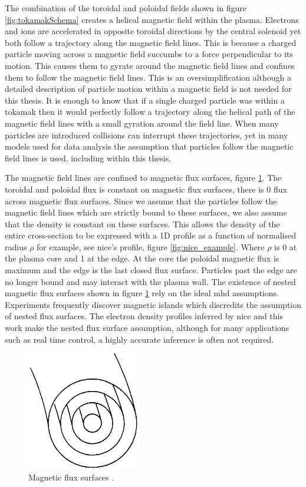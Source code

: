 The combination of the toroidal and poloidal fields shown in figure \ref{fig:tokamakSchema} creates a helical magnetic field within the plasma. Electrons and ions are accelerated in opposite toroidal directions by the central solenoid yet both follow a trajectory along the magnetic field lines. This is because a charged particle moving across a magnetic field succumbs to a force perpendicular to its motion. This causes them to gyrate around the magnetic field lines and confines them to follow the magnetic field lines. This is an oversimplification although a detailed description of particle motion within a magnetic field is not needed for this thesis. It is enough to know that if a single charged particle was within a tokamak then it would perfectly follow a trajectory along the helical path of the magnetic field lines with a small gyration around the field line. When many particles are introduced collisions can interrupt these trajectories, yet in many models used for data analysis the assumption that particles follow the magnetic field lines is used, including within this thesis. 

The magnetic field lines are confined to magnetic flux surfaces, figure \ref{fig:magfluxsurf}. The toroidal and poloidal flux is constant on magnetic flux surfaces, there is 0 flux across magnetic flux surfaces. Since we assume that the particles follow the magnetic field lines which are strictly bound to these surfaces, we also assume that the density is constant on these surfaces. This allows the density of the entire cross-section to be expressed with a 1D profile as a function of normalised radius $\rho$ for example, see \gls{nice}'s profile, figure \ref{fig:nice_example}. Where $\rho$ is 0 at the plasma core and 1 at the edge. At the core the poloidal magnetic flux is maximum and the edge is the last closed flux surface. Particles past the edge are no longer bound and may interact with the plasma wall. The existence of nested magnetic flux surfaces shown in figure \ref{fig:magfluxsurf} rely on the ideal \gls{mhd} assumptions. Experiments frequently discover magnetic islands which discredits the assumption of nested flux surfaces. The electron density profiles inferred by \gls{nice} and this work make the nested flux surface assumption, although for many applications such as real time control, a highly accurate inference is often not required.

\begin{figure}
  \centering
  \includegraphics[width=5cm]{images/fluxsurf.png}
  \caption{Magnetic flux surfaces \cite{wessontokamak}.}
  \label{fig:magfluxsurf}
\end{figure}

